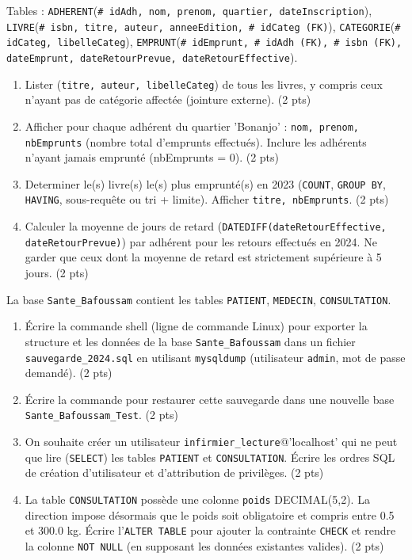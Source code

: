 \documentclass[11pt]{article}
\begin{document}
\begin{exercice}
Tables : \texttt{ADHERENT}(\texttt{\# idAdh, nom, prenom, quartier, dateInscription}), \texttt{LIVRE}(\texttt{\# isbn, titre, auteur, anneeEdition, \# idCateg (FK)}), \texttt{CATEGORIE}(\texttt{\# idCateg, libelleCateg}), \texttt{EMPRUNT}(\texttt{\# idEmprunt, \# idAdh (FK), \# isbn (FK), dateEmprunt, dateRetourPrevue, dateRetourEffective}).
\begin{enumerate}
    \item Lister (\texttt{titre, auteur, libelleCateg}) de tous les livres, y compris ceux n'ayant pas de catégorie affectée (jointure externe). \hfill (2 pts)
    \item Afficher pour chaque adhérent du quartier 'Bonanjo' : \texttt{nom, prenom, nbEmprunts} (nombre total d'emprunts effectués). Inclure les adhérents n'ayant jamais emprunté (nbEmprunts = 0). \hfill (2 pts)
    \item Determiner le(s) livre(s) le(s) plus emprunté(s) en 2023 (\texttt{COUNT}, \texttt{GROUP BY}, \texttt{HAVING}, sous-requête ou tri + limite). Afficher \texttt{titre, nbEmprunts}. \hfill (2 pts)
    \item Calculer la moyenne de jours de retard (\texttt{DATEDIFF(dateRetourEffective, dateRetourPrevue)}) par adhérent pour les retours effectués en 2024. Ne garder que ceux dont la moyenne de retard est strictement supérieure à 5 jours. \hfill (2 pts)
\end{enumerate}
\end{exercice}

\begin{exercice}
La base \texttt{Sante\_Bafoussam} contient les tables \texttt{PATIENT}, \texttt{MEDECIN}, \texttt{CONSULTATION}.
\begin{enumerate}
    \item Écrire la commande shell (ligne de commande Linux) pour exporter la structure et les données de la base \texttt{Sante\_Bafoussam} dans un fichier \texttt{sauvegarde\_2024.sql} en utilisant \texttt{mysqldump} (utilisateur \texttt{admin}, mot de passe demandé). \hfill (2 pts)
    \item Écrire la commande pour restaurer cette sauvegarde dans une nouvelle base \texttt{Sante\_Bafoussam\_Test}. \hfill (2 pts)
    \item On souhaite créer un utilisateur \texttt{infirmier\_lecture}@'localhost' qui ne peut que lire (\texttt{SELECT}) les tables \texttt{PATIENT} et \texttt{CONSULTATION}. Écrire les ordres SQL de création d'utilisateur et d'attribution de privilèges. \hfill (2 pts)
    \item La table \texttt{CONSULTATION} possède une colonne \texttt{poids} DECIMAL(5,2). La direction impose désormais que le poids soit obligatoire et compris entre 0.5 et 300.0 kg. Écrire l'\texttt{ALTER TABLE} pour ajouter la contrainte \texttt{CHECK} et rendre la colonne \texttt{NOT NULL} (en supposant les données existantes valides). \hfill (2 pts)
\end{enumerate}
\end{exercice}
\end{document}
